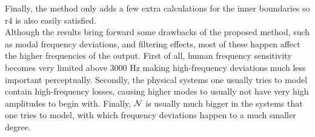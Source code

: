 Finally, the method only adds a few extra calculations for the inner boundaries so r4 is also easily satisfied. 
\\

Although the results bring forward some drawbacks of the proposed method, such as modal frequency deviations, and filtering effects, most of these happen affect the higher frequencies of the output. First of all, human frequency sensitivity becomes very limited above 3000 Hz \cite{Zwicker1990} making high-frequency deviations much less important perceptually. Secondly, the physical systems one usually tries to model contain high-frequency losses, causing higher modes to usually not have very high amplitudes to begin with. Finally, $\mathcal{N}$ is usually much bigger in the systems that one tries to model, with which frequency deviations happen to a much smaller degree. 

